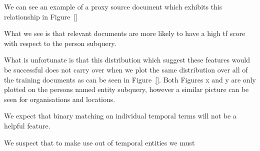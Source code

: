 \documentclass{mpaper}
\begin{document}
We can see an example of a proxy source document which exhibits this relationship in Figure~\ref{}

What we see is that relevant documents are more likely to have a high tf score with respect to the person subquery.


What is unfortunate is that this distribution which suggest these features would be successful does not carry over when we plot the same distribution over all of the training documents as can be seen in Figure~\ref{}. Both Figures x and y are only plotted on the persons named entity subquery, however a similar picture can be seen for organisations and locations.

We expect that binary matching on individual temporal terms will not be a helpful feature.

We suspect that to make use out of temporal entities we must 
\end{document}
